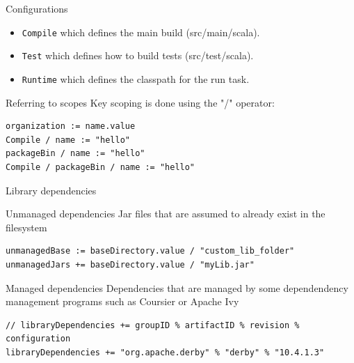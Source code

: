 \documentclass[aspectratio=169]{beamer}
\begin{document}
\begin{frame}{Configurations}
\begin{itemize}
  \item \texttt{Compile} which defines the main build (src/main/scala).
  \item \texttt{Test} which defines how to build tests (src/test/scala).
  \item \texttt{Runtime} which defines the classpath for the run task. 
\end{itemize}
\end{frame}

\begin{frame}[fragile]{Referring to scopes}
  Key scoping is done using the "/" operator:
\begin{verbatim}
organization := name.value
Compile / name := "hello"
packageBin / name := "hello"
Compile / packageBin / name := "hello"
\end{verbatim}
\end{frame}

\begin{frame}[fragile]{Library dependencies}
\begin{block}{Unmanaged dependencies}
Jar files that are assumed to already exist in the filesystem
\end{block}
\begin{verbatim}
unmanagedBase := baseDirectory.value / "custom_lib_folder"
unmanagedJars += baseDirectory.value / "myLib.jar"
\end{verbatim}
\pause
\vspace{1em}
\begin{block}{Managed dependencies}
Dependencies that are managed by some dependendency management programs such as Coursier or Apache
Ivy
\end{block}
\begin{verbatim}
// libraryDependencies += groupID % artifactID % revision % configuration
libraryDependencies += "org.apache.derby" % "derby" % "10.4.1.3"
\end{verbatim}
\end{frame}
\end{document}
